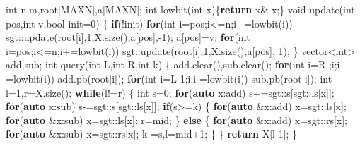 \documentclass[
]{article}
\newenvironment{Shaded}{}{}
\newcommand{\ControlFlowTok}[1]{\textcolor[rgb]{0.00,0.44,0.13}{\textbf{#1}}}
\newcommand{\DataTypeTok}[1]{\textcolor[rgb]{0.56,0.13,0.00}{#1}}
\newcommand{\DecValTok}[1]{\textcolor[rgb]{0.25,0.63,0.44}{#1}}
\newcommand{\KeywordTok}[1]{\textcolor[rgb]{0.00,0.44,0.13}{\textbf{#1}}}
\newcommand{\NormalTok}[1]{#1}
\begin{document}
\begin{Shaded}
\begin{Highlighting}[]
\DataTypeTok{int}\NormalTok{ n,m,root[MAXN],a[MAXN];}
\DataTypeTok{int}\NormalTok{ lowbit(}\DataTypeTok{int}\NormalTok{ x)\{}\ControlFlowTok{return}\NormalTok{ x\&{-}x;\}}
\DataTypeTok{void}\NormalTok{ update(}\DataTypeTok{int}\NormalTok{ pos,}\DataTypeTok{int}\NormalTok{ v,}\DataTypeTok{bool}\NormalTok{ init=}\DecValTok{0}\NormalTok{)}
\NormalTok{\{}
    \ControlFlowTok{if}\NormalTok{(!init)}
    \ControlFlowTok{for}\NormalTok{(}\DataTypeTok{int}\NormalTok{ i=pos;i\textless{}=n;i+=lowbit(i))}
\NormalTok{        sgt::update(root[i],}\DecValTok{1}\NormalTok{,X.size(),a[pos],{-}}\DecValTok{1}\NormalTok{);}
\NormalTok{    a[pos]=v;}
    \ControlFlowTok{for}\NormalTok{(}\DataTypeTok{int}\NormalTok{ i=pos;i\textless{}=n;i+=lowbit(i))}
\NormalTok{        sgt::update(root[i],}\DecValTok{1}\NormalTok{,X.size(),a[pos], }\DecValTok{1}\NormalTok{);}
\NormalTok{\}}
\NormalTok{vector\textless{}}\DataTypeTok{int}\NormalTok{\textgreater{} add,sub;}
\DataTypeTok{int}\NormalTok{ query(}\DataTypeTok{int}\NormalTok{ L,}\DataTypeTok{int}\NormalTok{ R,}\DataTypeTok{int}\NormalTok{ k)}
\NormalTok{\{}
\NormalTok{    add.clear(),sub.clear();}
    \ControlFlowTok{for}\NormalTok{(}\DataTypeTok{int}\NormalTok{ i=R  ;i;i{-}=lowbit(i)) add.pb(root[i]);}
    \ControlFlowTok{for}\NormalTok{(}\DataTypeTok{int}\NormalTok{ i=L{-}}\DecValTok{1}\NormalTok{;i;i{-}=lowbit(i)) sub.pb(root[i]);}
    \DataTypeTok{int}\NormalTok{ l=}\DecValTok{1}\NormalTok{,r=X.size();}
    \ControlFlowTok{while}\NormalTok{(l!=r)}
\NormalTok{    \{}
        \DataTypeTok{int}\NormalTok{ s=}\DecValTok{0}\NormalTok{;}
        \ControlFlowTok{for}\NormalTok{(}\KeywordTok{auto}\NormalTok{ x:add) s+=sgt::s[sgt::ls[x]];}
        \ControlFlowTok{for}\NormalTok{(}\KeywordTok{auto}\NormalTok{ x:sub) s{-}=sgt::s[sgt::ls[x]];}
        \ControlFlowTok{if}\NormalTok{(s\textgreater{}=k)}
\NormalTok{        \{}
            \ControlFlowTok{for}\NormalTok{(}\KeywordTok{auto}\NormalTok{ \&x:add) x=sgt::ls[x];}
            \ControlFlowTok{for}\NormalTok{(}\KeywordTok{auto}\NormalTok{ \&x:sub) x=sgt::ls[x];}
\NormalTok{            r=mid;}
\NormalTok{        \}}
        \ControlFlowTok{else}
\NormalTok{        \{}
            \ControlFlowTok{for}\NormalTok{(}\KeywordTok{auto}\NormalTok{ \&x:add) x=sgt::rs[x];}
            \ControlFlowTok{for}\NormalTok{(}\KeywordTok{auto}\NormalTok{ \&x:sub) x=sgt::rs[x];}
\NormalTok{            k{-}=s,l=mid+}\DecValTok{1}\NormalTok{;}
\NormalTok{        \}}
\NormalTok{    \}}
    \ControlFlowTok{return}\NormalTok{ X[l{-}}\DecValTok{1}\NormalTok{];}
\NormalTok{\}}


\end{Highlighting}
\end{Shaded}
\end{document}
